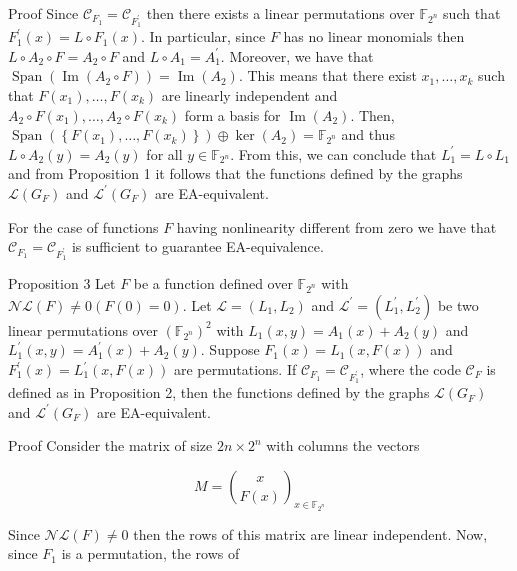 \documentclass[10pt]{article}
\begin{document}
Proof Since $\mathscr{C}_{F_{1}}=\mathscr{C}_{F_{1}^{\prime}}$ then there exists a linear permutations over $\mathbb{F}_{2^{n}}$ such that $F_{1}^{\prime}(x)= L \circ F_{1}(x)$. In particular, since $F$ has no linear monomials then $L \circ A_{2} \circ F=A_{2} \circ F$ and $L \circ A_{1}=A_{1}^{\prime}$. Moreover, we have that $\operatorname{Span}\left(\operatorname{Im}\left(A_{2} \circ F\right)\right)=\operatorname{Im}\left(A_{2}\right)$. This means that there exist $x_{1}, \ldots, x_{k}$ such that $F\left(x_{1}\right), \ldots, F\left(x_{k}\right)$ are linearly independent and $A_{2} \circ F\left(x_{1}\right), \ldots, A_{2} \circ F\left(x_{k}\right)$ form a basis for $\operatorname{Im}\left(A_{2}\right)$. Then, $\operatorname{Span}\left(\left\{F\left(x_{1}\right), \ldots, F\left(x_{k}\right)\right\}\right) \oplus \operatorname{ker}\left(A_{2}\right)=\mathbb{F}_{2^{n}}$ and thus $L \circ A_{2}(y)=A_{2}(y)$ for all $y \in \mathbb{F}_{2^{n}}$. From this, we can conclude that $L_{1}^{\prime}=L \circ L_{1}$ and from Proposition 1 it follows that the functions defined by the graphs $\mathscr{L}\left(G_{F}\right)$ and $\mathscr{L}^{\prime}\left(G_{F}\right)$ are EA-equivalent.

For the case of functions $F$ having nonlinearity different from zero we have that $\mathscr{C}_{F_{1}}= \mathscr{C}_{F_{1}^{\prime}}$ is sufficient to guarantee EA-equivalence.

Proposition 3 Let $F$ be a function defined over $\mathbb{F}_{2^{n}}$ with $\mathscr{N} \mathscr{L}(F) \neq 0(F(0)=0)$. Let $\mathscr{L}=\left(L_{1}, L_{2}\right)$ and $\mathscr{L}^{\prime}=\left(L_{1}^{\prime}, L_{2}^{\prime}\right)$ be two linear permutations over $\left(\mathbb{F}_{2^{n}}\right)^{2}$ with $L_{1}(x, y)=A_{1}(x)+A_{2}(y)$ and $L_{1}^{\prime}(x, y)=A_{1}^{\prime}(x)+A_{2}(y)$. Suppose $F_{1}(x)=L_{1}(x, F(x))$ and $F_{1}^{\prime}(x)=L_{1}^{\prime}(x, F(x))$ are permutations. If $\mathscr{C}_{F_{1}}=\mathscr{C}_{F_{1}^{\prime}}$, where the code $\mathscr{C}_{F}$ is defined as in Proposition 2, then the functions defined by the graphs $\mathscr{L}\left(G_{F}\right)$ and $\mathscr{L}^{\prime}\left(G_{F}\right)$ are EA-equivalent.

Proof Consider the matrix of size $2 n \times 2^{n}$ with columns the vectors

$$
M=\binom{x}{F(x)}_{x \in \mathbb{F}_{2^{n}}}
$$

Since $\mathscr{N} \mathscr{L}(F) \neq 0$ then the rows of this matrix are linear independent. Now, since $F_{1}$ is a permutation, the rows of
\end{document}
